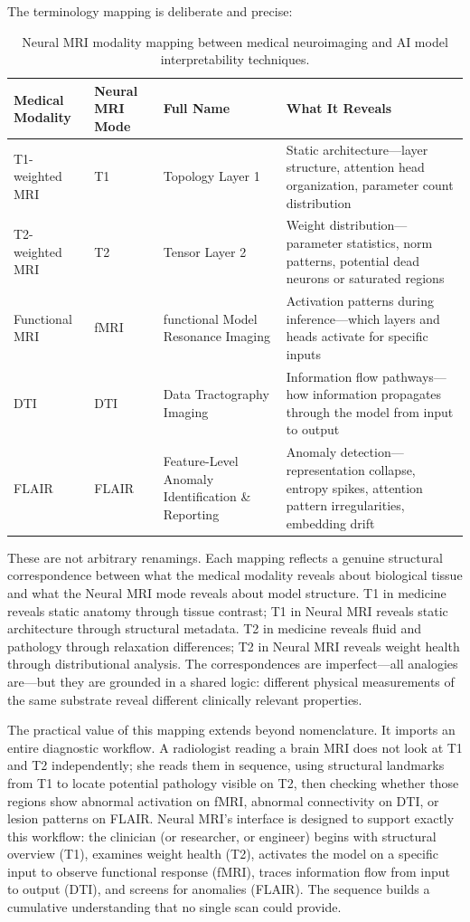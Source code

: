 \documentclass[11pt]{article}
\begin{document}
The terminology mapping is deliberate and precise:

\begin{table}[htbp]
\centering
\caption{Neural MRI modality mapping between medical neuroimaging and AI model interpretability techniques.}
\label{tab:modality-mapping}
\footnotesize
\begin{tabular}{llp{3.5cm}p{5.2cm}}
\toprule
\textbf{Medical Modality} & \textbf{Neural MRI Mode} & \textbf{Full Name} & \textbf{What It Reveals} \\
\midrule
T1-weighted MRI & T1 & Topology Layer 1 & Static architecture---layer structure, attention head organization, parameter count distribution \\
T2-weighted MRI & T2 & Tensor Layer 2 & Weight distribution---parameter statistics, norm patterns, potential dead neurons or saturated regions \\
Functional MRI & fMRI & functional Model Resonance Imaging & Activation patterns during inference---which layers and heads activate for specific inputs \\
DTI & DTI & Data Tractography Imaging & Information flow pathways---how information propagates through the model from input to output \\
FLAIR & FLAIR & Feature-Level Anomaly Identification \& Reporting & Anomaly detection---representation collapse, entropy spikes, attention pattern irregularities, embedding drift \\
\bottomrule
\end{tabular}
\end{table}

These are not arbitrary renamings. Each mapping reflects a genuine structural correspondence between what the medical modality reveals about biological tissue and what the Neural MRI mode reveals about model structure. T1 in medicine reveals static anatomy through tissue contrast; T1 in Neural MRI reveals static architecture through structural metadata. T2 in medicine reveals fluid and pathology through relaxation differences; T2 in Neural MRI reveals weight health through distributional analysis. The correspondences are imperfect---all analogies are---but they are grounded in a shared logic: different physical measurements of the same substrate reveal different clinically relevant properties.

The practical value of this mapping extends beyond nomenclature. It imports an entire diagnostic workflow. A radiologist reading a brain MRI does not look at T1 and T2 independently; she reads them in sequence, using structural landmarks from T1 to locate potential pathology visible on T2, then checking whether those regions show abnormal activation on fMRI, abnormal connectivity on DTI, or lesion patterns on FLAIR. Neural MRI's interface is designed to support exactly this workflow: the clinician (or researcher, or engineer) begins with structural overview (T1), examines weight health (T2), activates the model on a specific input to observe functional response (fMRI), traces information flow from input to output (DTI), and screens for anomalies (FLAIR). The sequence builds a cumulative understanding that no single scan could provide.
\end{document}
